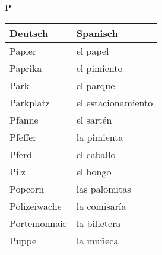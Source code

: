 \begin{flushright}\begin{Huge}\textbf{P}\end{Huge}\end{flushright}

\begin{longtable}{p{} p{}} 
\textbf{Deutsch}     & \textbf{Spanisch}                                       \\ \hline
\hline
\endhead %
Papier & el papel \\
Paprika & el pimiento\\
Park & el parque \\
Parkplatz & el estacionamiento \\
Pfanne & el sartén\\
Pfeffer & la pimienta\\
Pferd & el caballo\\
Pilz & el hongo\\
Popcorn & las palomitas\\
Polizeiwache & la comisaría\\
Portemonnaie & la billetera\\
Puppe & la muñeca
\end{longtable}
